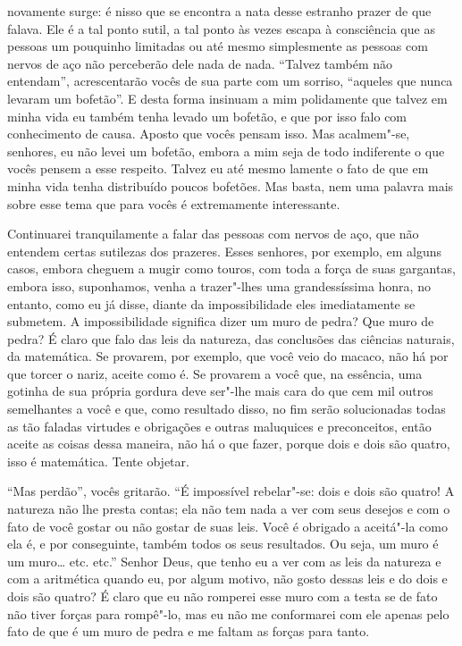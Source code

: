 novamente surge: é nisso que se encontra a nata desse estranho prazer de que
falava. Ele é a tal ponto sutil, a tal ponto às vezes escapa à consciência que
as pessoas um pouquinho limitadas ou até mesmo simplesmente as pessoas com
nervos de aço não perceberão dele nada de nada. “Talvez também não entendam”,
acrescentarão vocês de sua parte com um sorriso, “aqueles que nunca levaram um
bofetão”. E desta forma insinuam a mim polidamente que talvez em minha vida eu
também tenha levado um bofetão, e que por isso falo com conhecimento de causa.
Aposto que vocês pensam isso. Mas acalmem"-se, senhores, eu não levei um
bofetão, embora a mim seja de todo indiferente o que vocês pensem a esse
respeito. Talvez eu até mesmo lamente o fato de que em minha vida tenha
distribuído poucos bofetões. Mas basta, nem uma palavra mais sobre esse tema
que para vocês é extremamente interessante.

Continuarei tranquilamente a falar das pessoas com nervos de aço, que
não entendem certas sutilezas dos prazeres. Esses senhores, por
exemplo, em alguns casos, embora cheguem a mugir como touros, com toda
a força de suas gargantas, embora isso, suponhamos, venha a trazer"-lhes
uma grandessíssima honra, no entanto, como eu já disse, diante da
impossibilidade eles imediatamente se submetem. A impossibilidade
significa dizer um muro de pedra? Que muro de pedra? É claro que falo
das leis da natureza, das conclusões das ciências naturais, da
matemática. Se provarem, por exemplo, que você veio do macaco, não há
por que torcer o nariz, aceite como é. Se provarem a você que, na
essência, uma gotinha de sua própria gordura deve ser"-lhe mais cara do
que cem mil outros semelhantes a você e que, como resultado disso, no
fim serão solucionadas todas as tão faladas virtudes e obrigações e
outras maluquices e preconceitos, então aceite as coisas dessa maneira,
não há o que fazer, porque dois e dois são quatro, isso é matemática.
Tente objetar.

“Mas perdão”, vocês gritarão. “É impossível rebelar"-se: dois e dois são
quatro! A natureza não lhe presta contas; ela não tem nada a ver com
seus desejos e com o fato de você gostar ou não gostar de suas leis.
Você é obrigado a aceitá"-la como ela é, e por conseguinte, também todos
os seus resultados. Ou seja, um muro é um muro\ldots{} etc. etc.” Senhor
Deus, que tenho eu a ver com as leis da natureza e com a aritmética
quando eu, por algum motivo, não gosto dessas leis e do dois e dois são
quatro? É claro que eu não romperei esse muro com a testa se de fato
não tiver forças para rompê"-lo, mas eu não me conformarei com ele
apenas pelo fato de que é um muro de pedra e me faltam as forças para
tanto.

